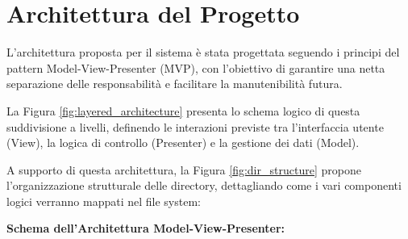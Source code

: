 \documentclass[openany]{theme/uniprthesis}
\begin{document}
\newpage
\section{Architettura del Progetto}
L'architettura proposta per il sistema è stata progettata seguendo i principi del pattern Model-View-Presenter (MVP), con l'obiettivo di garantire una netta separazione delle responsabilità e facilitare la manutenibilità futura.

La Figura \ref{fig:layered_architecture} presenta lo schema logico di questa suddivisione a livelli, definendo le interazioni previste tra l'interfaccia utente (View), la logica di controllo (Presenter) e la gestione dei dati (Model).

A supporto di questa architettura, la Figura \ref{fig:dir_structure} propone l'organizzazione strutturale delle directory, dettagliando come i vari componenti logici verranno mappati nel file system:


\noindent\textbf{Schema dell'Architettura Model-View-Presenter:}
\end{document}
